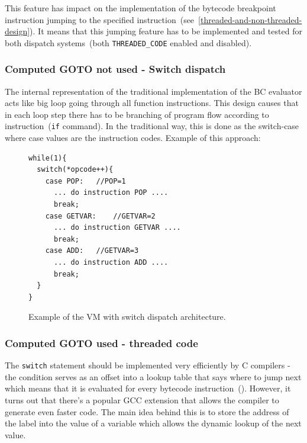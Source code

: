 \documentclass[thesis=M,english]{FITthesis}[2018/10/20]
\newcommand{\code}[1]{\texttt{#1}}
\begin{document}
This feature has impact on the implementation of the bytecode breakpoint instruction jumping to the specified instruction~(see~\ref{threaded-and-non-threaded-design}). It means that this jumping feature has to be implemented and tested for both dispatch systems~(both \code{THREADED{\_}CODE} enabled and disabled).

\subsubsection{Computed GOTO not used - Switch dispatch}\label{computed-goto-not-used}

The internal representation of the traditional implementation of the BC evaluator acts like big loop going through all function instructions. This design causes that in each loop step there has to be branching of program flow according to instruction~(\code{if} command). In the traditional way, this is done as the switch-case where case values are the instruction codes. Example of this approach:

\begin{figure}[H]
\begin{lstlisting}
while(1){
  switch(*opcode++){
    case POP:	//POP=1
      ... do instruction POP ....
      break;
    case GETVAR:	//GETVAR=2
      ... do instruction GETVAR ....
      break;
    case ADD:	//GETVAR=3
      ... do instruction ADD ....
      break;
  }
}
\end{lstlisting}
\caption{\label{fig:goto-not-used} Example of the VM with switch dispatch architecture.}
\end{figure}

\subsubsection{Computed GOTO used - threaded code}\label{computed-goto-used}

The \code{switch} statement should be implemented very efficiently by C compilers - the condition serves as an offset into a lookup table that says where to jump next which means that it is evaluated for every bytecode instruction~(\cite{COMPUTED_GOTO}). However, it turns out that there's a popular GCC extension that allows the compiler to generate even faster code. The main idea behind this is to store the address of the label into the value of a variable which allows the dynamic lookup of the next value.
\end{document}
